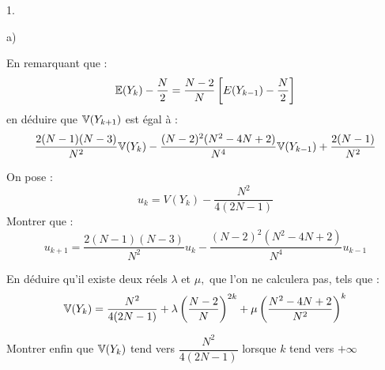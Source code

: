 \documentclass[11pt]{article}%
\begin{document}
\begin{noliste}{1.}
\begin{noliste}{a)}
\item En remarquant que :
\[
\mathbb{E}(Y_{k})-\dfrac{N}{2} = \dfrac{N-2}{N}\left[
E(Y_{k-1})-\dfrac{N}{2}\right]
\]
en déduire que $\mathbb{V}(Y_{k + 1})$ est égal à :
\[
\dfrac{2(N-1)(N-3)}{N^{2}}\mathbb{V}(Y_{k})-\dfrac{(N-2)^{2}(N^{2}-4N +
2)}{N^{4}}\mathbb{V}(Y_{k-1}) + \dfrac{2(N-1)}{N^{2}}
\]

\item On pose :
\[
u_{k} = V(Y_{k})-\dfrac{N^{2}}{4(2N-1)}
\]
Montrer que :
\[
u_{k + 1} = \dfrac{2(N-1)(N-3)}{N^{2}}u_{k}-\dfrac{(N-2)^{2}(N^{2}-4N +
2)}{N^{4}}u_{k-1}
\]

\item En déduire qu'il existe deux réels $\lambda $ et $\mu,$ que l'on
ne
calculera pas, tels que :
\[
\mathbb{V}(Y_{k}) = \dfrac{N^{2}}{4(2N-1)} + \lambda \left(
\dfrac{N-2}{N}\right)
^{2k} + \mu \left( \dfrac{N^{2}-4N + 2}{N^{2}}\right) ^{k}
\]

\item Montrer enfin que $\mathbb{V}(Y_{k})$ tend vers $\dfrac{N^{2}}{4(2N-1)}$
lorsque $k$ tend vers $ + \infty $
\end{noliste}
\end{noliste}

\label{fin}
\end{document}
